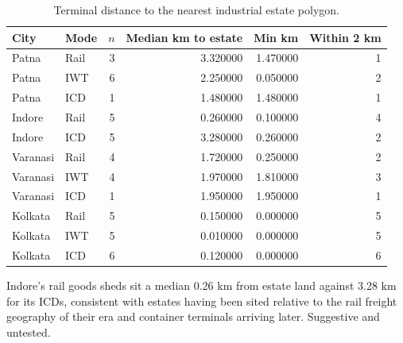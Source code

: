 \begin{table}[htbp]
\centering
\small
\caption{Terminal distance to the nearest industrial estate polygon.}
\label{tab:s9b_estate_terminals}
\begin{tabular}{llrrrr}
\toprule
City & Mode & $n$ & Median km to estate & Min km & Within 2 km \\
\midrule
Patna & Rail & 3 & 3.320000 & 1.470000 & 1 \\
Patna & IWT & 6 & 2.250000 & 0.050000 & 2 \\
Patna & ICD & 1 & 1.480000 & 1.480000 & 1 \\
Indore & Rail & 5 & 0.260000 & 0.100000 & 4 \\
Indore & ICD & 5 & 3.280000 & 0.260000 & 2 \\
Varanasi & Rail & 4 & 1.720000 & 0.250000 & 2 \\
Varanasi & IWT & 4 & 1.970000 & 1.810000 & 3 \\
Varanasi & ICD & 1 & 1.950000 & 1.950000 & 1 \\
Kolkata & Rail & 5 & 0.150000 & 0.000000 & 5 \\
Kolkata & IWT & 5 & 0.010000 & 0.000000 & 5 \\
Kolkata & ICD & 6 & 0.120000 & 0.000000 & 6 \\
\bottomrule
\end{tabular}
\begin{tablenotes}\footnotesize
\item Indore's rail goods sheds sit a median 0.26 km from estate land against 3.28 km for its ICDs, consistent with estates having been sited relative to the rail freight geography of their era and container terminals arriving later. Suggestive and untested.
\end{tablenotes}
\end{table}
